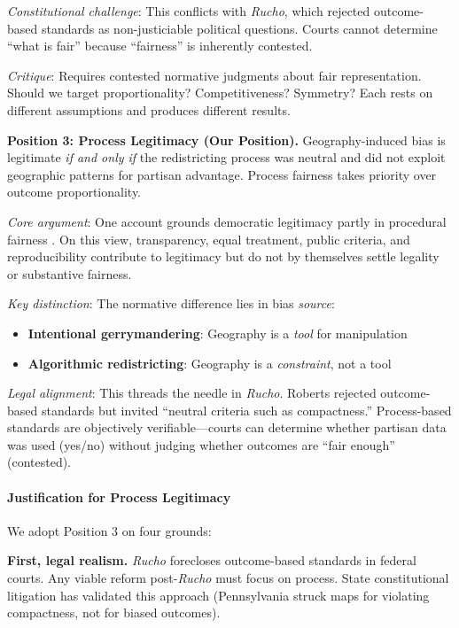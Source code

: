 \textit{Constitutional challenge}: This conflicts with \textit{Rucho}, which rejected outcome-based standards as non-justiciable political questions. Courts cannot determine ``what is fair'' because ``fairness'' is inherently contested.

\textit{Critique}: Requires contested normative judgments about fair representation. Should we target proportionality? Competitiveness? Symmetry? Each rests on different assumptions and produces different results.

\textbf{Position 3: Process Legitimacy (Our Position).}
Geography-induced bias is legitimate \textit{if and only if} the redistricting process was neutral and did not exploit geographic patterns for partisan advantage. Process fairness takes priority over outcome proportionality.

\textit{Core argument}: One account grounds democratic legitimacy partly in procedural fairness \citep{rawls1971theory}. On this view, transparency, equal treatment, public criteria, and reproducibility contribute to legitimacy but do not by themselves settle legality or substantive fairness.

\textit{Key distinction}: The normative difference lies in bias \textit{source}:
\begin{itemize}
\item \textbf{Intentional gerrymandering}: Geography is a \textit{tool} for manipulation
\item \textbf{Algorithmic redistricting}: Geography is a \textit{constraint}, not a tool
\end{itemize}

\textit{Legal alignment}: This threads the needle in \textit{Rucho}. Roberts rejected outcome-based standards but invited ``neutral criteria such as compactness.'' Process-based standards are objectively verifiable---courts can determine whether partisan data was used (yes/no) without judging whether outcomes are ``fair enough'' (contested).

\paragraph{Justification for Process Legitimacy}

We adopt Position 3 on four grounds:

\textbf{First, legal realism.} \textit{Rucho} forecloses outcome-based standards in federal courts. Any viable reform post-\textit{Rucho} must focus on process. State constitutional litigation has validated this approach (Pennsylvania struck maps for violating compactness, not for biased outcomes).

